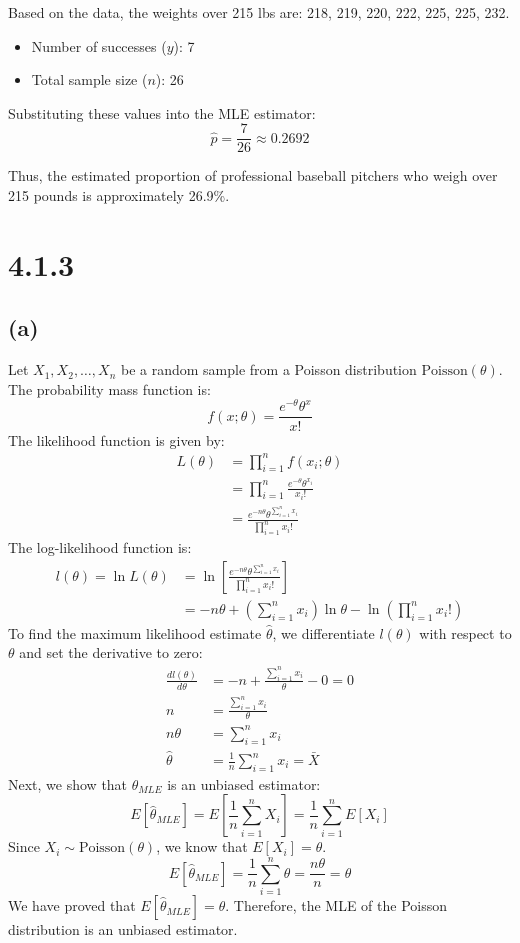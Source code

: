\documentclass{article}
\begin{document}
\noindent
Based on the data, the weights over 215 lbs are: 218, 219, 220, 222, 225, 225, 232.
\begin{itemize}
    \item Number of successes ($y$): 7
    \item Total sample size ($n$): 26
\end{itemize}

Substituting these values into the MLE estimator:
\[
\hat{p} = \frac{7}{26} \approx 0.2692
\]

\noindent
Thus, the estimated proportion of professional baseball pitchers who weigh over 215 pounds is 
approximately 26.9\%.

\section*{4.1.3}
\subsection*{(a)}
Let $X_1, X_2, \dots, X_n$ be a random sample from a Poisson distribution 
$\text{Poisson}(\theta)$. The probability mass function is:
\[
f(x; \theta ) = \frac{e^{-\theta} \theta^x }{x!}
\]
The likelihood function is given by:
\begin{align*}
L(\theta) &= \prod_{i=1}^n f(x_i; \theta )\\
&= \prod_{i=1}^n \frac{e^{-\theta} \theta^{x_i} }{x_i!}\\
&= \frac{e^{-n\theta} \theta^{\sum_{i=1}^{n} x_i}}{\prod_{i=1}^n x_i!}
\end{align*}
The log-likelihood function is:
\begin{align*}
l(\theta) = \ln L(\theta) &= 
\ln \left[\frac{e^{-n\theta} \theta^{\sum_{i=1}^{n} x_i}}{\prod_{i=1}^n x_i!}\right]\\
&= -n \theta + \left(\sum_{i=1}^{n} x_i\right) \ln \theta - \ln \left(\prod_{i=1}^n x_i!\right)
\end{align*}
To find the maximum likelihood estimate $\hat{\theta}$, we differentiate $l(\theta)$ with respect 
to $\theta$ and set the derivative to zero:
\begin{align*}
\frac{d l(\theta)}{d \theta} &= -n + \frac{\sum_{i=1}^{n} x_i}{\theta} - 0 = 0\\
n &= \frac{\sum_{i=1}^{n} x_i}{\theta}\\
n \theta &= \sum_{i=1}^{n} x_i\\
\hat{\theta} &= \frac{1}{n} \sum_{i=1}^{n} x_i = \bar{X}
\end{align*}
Next, we show that $\hat{\theta}_{MLE}$ is an unbiased estimator:
\[
E[\hat{\theta}_{MLE}] = E\left[\frac{1}{n} \sum_{i=1}^{n} X_i\right] = 
\frac{1}{n}\sum_{i=1}^{n} E\left[ X_i\right]
\]
Since $X_i \sim \text{Poisson}(\theta)$, we know that $E[X_i] = \theta$.
\[
E[\hat{\theta}_{MLE}] = \frac{1}{n}\sum_{i=1}^{n} \theta = \frac{n \theta}{n}= \theta
\]
We have proved that $E[\hat{\theta}_{MLE}] = \theta$. Therefore, the MLE of the Poisson 
distribution is an unbiased estimator.
\end{document}
